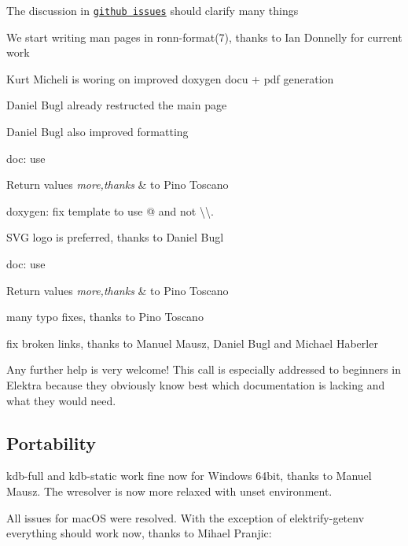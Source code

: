 \begin{DoxyItemize}
\item The discussion in \href{https://git.libelektra.org/issues}{\tt github issues} should clarify many things
\item We start writing man pages in ronn-\/format(7), thanks to Ian Donnelly for current work
\item Kurt Micheli is woring on improved doxygen docu + pdf generation
\item Daniel Bugl already restructed the main page
\item Daniel Bugl also improved formatting
\item doc\+: use 
\begin{DoxyRetVals}{Return values}
{\em more,thanks} & to Pino Toscano\\
\hline
\end{DoxyRetVals}

\item doxygen\+: fix template to use {\ttfamily @} and not {\ttfamily \textbackslash{}\textbackslash{}}.
\item S\+VG logo is preferred, thanks to Daniel Bugl
\item doc\+: use 
\begin{DoxyRetVals}{Return values}
{\em more,thanks} & to Pino Toscano\\
\hline
\end{DoxyRetVals}

\item many typo fixes, thanks to Pino Toscano
\item fix broken links, thanks to Manuel Mausz, Daniel Bugl and Michael Haberler
\end{DoxyItemize}

Any further help is very welcome! This call is especially addressed to beginners in Elektra because they obviously know best which documentation is lacking and what they would need.

\subsection*{Portability}

{\ttfamily kdb-\/full} and {\ttfamily kdb-\/static} work fine now for Windows 64bit, thanks to Manuel Mausz. The wresolver is now more relaxed with unset environment.

All issues for mac\+OS were resolved. With the exception of elektrify-\/getenv everything should work now, thanks to Mihael Pranjic\+:


